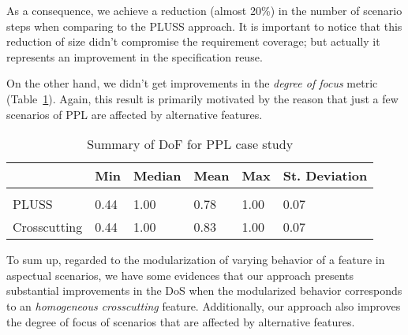 As a consequence, we achieve a reduction (almost 20\%) in the number of scenario
steps when comparing to the PLUSS approach. It is important to notice that this
reduction of size didn't compromise the requirement coverage; but actually it
represents an improvement in the specification reuse.

On the other hand, we
didn't get improvements in the \emph{degree of focus} metric
(Table~\ref{tab:ppl-dof}). Again, this result is primarily motivated by the
reason that just a few scenarios of PPL are affected by alternative features.

\begin{table}[htb] \centering
\caption{Summary of DoF for PPL case study}
\label{tab:ppl-dof}
\begin{small}
\begin{tabular}{llllll} \hline
					& Min 	& Median 	& Mean 	& Max 	& St. Deviation \\ \hline \\
	PLUSS			& 0.44	& 1.00		& 0.78	& 1.00	& 0.07			\\
	Crosscutting	& 0.44  & 1.00   	& 0.83 	& 1.00 	& 0.07			\\ \hline	
\end{tabular}
\end{small}
\end{table}

To sum up, regarded to the modularization of
varying behavior of a feature in aspectual scenarios, we have some evidences
that our approach presents substantial improvements in the DoS when the
modularized behavior corresponds to an \emph{homogeneous crosscutting} feature. Additionally,
our approach also improves the degree of focus of scenarios that are affected
by alternative features. 




